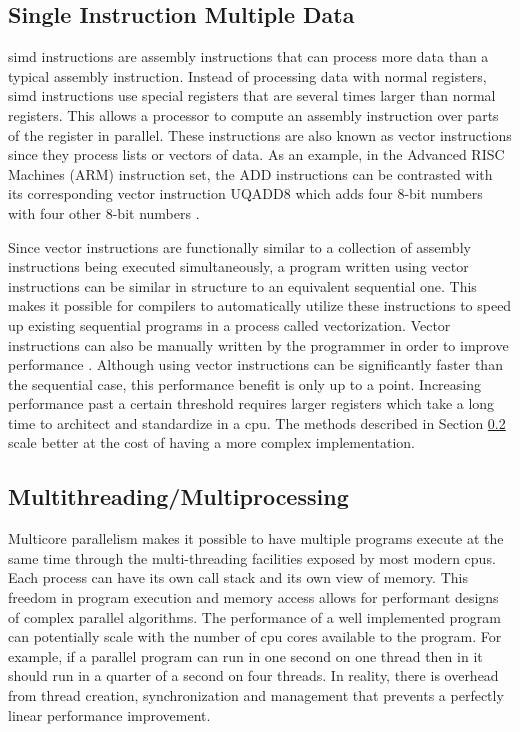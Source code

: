 \subsection{Single Instruction Multiple Data} \label{simd}

\gls{simd} instructions are assembly instructions that can process more data
than a typical assembly instruction. Instead of processing data with normal
registers, \gls{simd} instructions use special registers that are several
times larger than normal registers. This allows a processor to compute an
assembly instruction over parts of the register in parallel. These instructions
are also known as vector instructions since they process lists or vectors
of data. As an example, in the Advanced RISC Machines (ARM) instruction
set, the ADD instructions can be contrasted with its corresponding vector
instruction UQADD8 which adds four 8-bit numbers with four other 8-bit numbers
\citep{noauthor_arm_nodate}.

Since vector instructions are functionally similar to a collection of assembly
instructions being executed simultaneously, a program written using vector
instructions can be similar in structure to an equivalent sequential one. This
makes it possible for compilers to automatically utilize these instructions
to speed up existing sequential programs in a process called vectorization.
Vector instructions can also be manually written by the programmer in order to
improve performance \cite{langdale_parsing_2019, mytkowicz_data-parallel_2014}.
Although using vector instructions can be significantly faster than the
sequential case, this performance benefit is only up to a point. Increasing
performance past a certain threshold requires larger registers which take a
long time to architect and standardize in a \gls{cpu}. The methods described in
Section \ref{multithreading} scale better at the cost of having a more complex
implementation.

\subsection{Multithreading/Multiprocessing} \label{multithreading}

Multicore parallelism makes it possible to have multiple programs execute
at the same time through the multi-threading facilities exposed by most
modern \glspl{cpu}. Each process can have its own call stack and its own view
of memory. This freedom in program execution and memory access allows for
performant designs of complex parallel algorithms. The performance of a well
implemented program can potentially scale with the number of \gls{cpu} cores
available to the program. For example, if a parallel program can run in one second
on one thread then in it should run in a quarter of a second on four threads. In
reality, there is overhead from thread creation, synchronization and management
that prevents a perfectly linear performance improvement.

